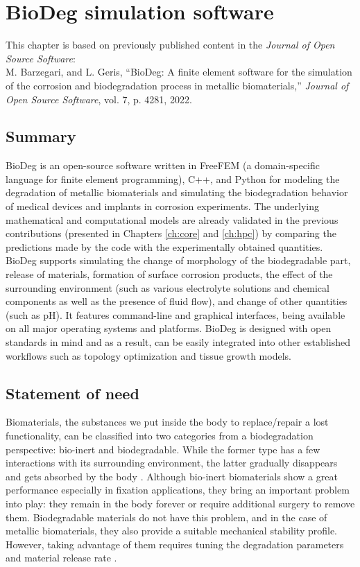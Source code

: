 \chapter{BioDeg simulation software}\label{ch:biodeg}


\begin{shaded}
This chapter is based on previously published content in the \textit{Journal of Open Source Software}:\\
M. Barzegari, and L. Geris, ``BioDeg: A finite element software for the simulation of the corrosion and biodegradation process in metallic biomaterials,'' \textit{Journal of Open Source Software}, vol. 7, p. 4281, 2022.
\end{shaded}

\section{Summary}

BioDeg is an open-source software written in FreeFEM (a domain-specific language for finite element programming), C++, and Python for modeling the degradation of metallic biomaterials and simulating the biodegradation behavior of medical devices and implants in corrosion experiments. The underlying mathematical and computational models are already validated in the previous contributions \cite{Barzegari2021, Barzegari2022} (presented in Chapters \ref{ch:core} and \ref{ch:hpc}) by comparing the predictions made by the code with the experimentally obtained quantities. BioDeg supports simulating the change of morphology of the biodegradable part, release of materials, formation of surface corrosion products, the effect of the surrounding environment (such as various electrolyte solutions and chemical components as well as the presence of fluid flow), and change of other quantities (such as pH). It features command-line and graphical interfaces, being available on all major operating systems and platforms. BioDeg is designed with open standards in mind and as a result, can be easily integrated into other established workflows such as topology optimization and tissue growth models.

\section{Statement of need}

Biomaterials, the substances we put inside the body to replace/repair a lost functionality, can be classified into two categories from a biodegradation perspective: bio-inert and biodegradable. While the former type has a few interactions with its surrounding environment, the latter gradually disappears and gets absorbed by the body \cite{Zheng2014, Chen2014}. Although bio-inert biomaterials show a great performance especially in fixation applications, they bring an important problem into play: they remain in the body forever or require additional surgery to remove them. Biodegradable materials do not have this problem, and in the case of metallic biomaterials, they also provide a suitable mechanical stability profile. However, taking advantage of them requires tuning the degradation parameters and material release rate \cite{Zhao2017}.

